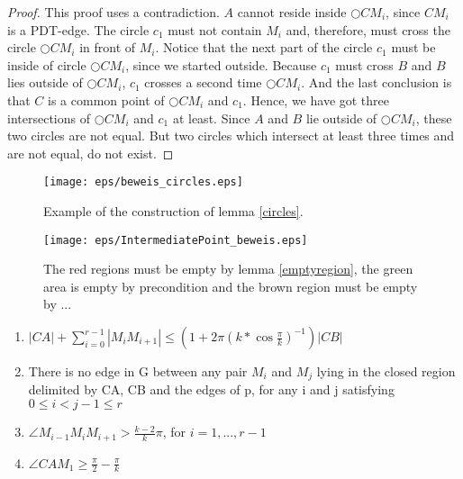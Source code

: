 \begin{proof}
This proof uses a contradiction. %
$A $ cannot reside inside $\bigcirc{CM_i} $, since $CM_i $ is a PDT-edge.
The circle $c_1 $ must not contain $M_i $ and, therefore, must cross the circle $\bigcirc{CM_i} $ in front of $M_i $.
Notice that the next part of the circle $c_1 $ must be inside of circle $\bigcirc{CM_i} $, since we started outside.
Because $c_1 $ must cross $B $ and $B $ lies outside of $\bigcirc{CM_i} $, $c_1 $ crosses a second time $\bigcirc{CM_i} $.
And the last conclusion is that $C $ is a common point of $\bigcirc{CM_i} $ and $c_1 $.
Hence, we have got three intersections of $\bigcirc{CM_i} $ and $c_1 $ at least.
Since $A $ and $B $ lie outside of $\bigcirc{CM_i} $, these two circles are not equal.
But two circles which intersect at least three times and are not equal, do not exist.
\end{proof}
\begin{figure}[h!]
\centering
\texttt{[image: eps/beweis\_circles.eps]}
\caption{Example of the construction of lemma \ref{circles}.}
\label{fig:beweis_circles}
\end{figure}

 
\begin{figure}[h!]
\centering
\texttt{[image: eps/IntermediatePoint\_beweis.eps]}
\caption{The red regions must be empty by lemma \ref{emptyregion}, the green area is empty by precondition and the brown region must be empty by ... }
\label{fig:intermediate_point_beweis}
\end{figure}


\begin{enumerate}
\item $|CA| + \sum\nolimits_{i=0}^{r-1} |M_iM_{i+1}| \leq (1+2\pi (k*\cos{\frac{\pi}{k}})^{-1})|CB| $
\item There is no edge in G between any pair $M_i $ and $M_j $ lying in the closed region delimited by CA, CB and the edges of p, for any i and j satisfying $0 \leq i < j-1 \leq r $ 
\item $\angle{M_{i-1}M_iM_{i+1}} > \frac{k-2}{k}\pi $, for $i=1, ..., r-1 $ 
\item $\angle{CAM_1} \geq \frac{\pi}{2}-\frac{\pi}{k} $
\end{enumerate}


